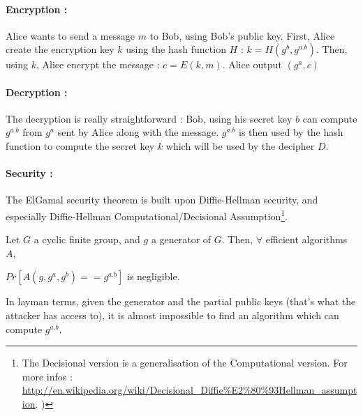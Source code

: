 \paragraph{Encryption :}

Alice wants to send a message $m$ to Bob, using Bob's public key. First, Alice create the encryption key $k$ using the hash function $H$ : $k = H(g^b, g^{a.b}) $. Then, using $k$, Alice encrypt the message : $c = E(k,m)$. Alice output $(g^a, c)$

\paragraph{Decryption :} 
The decryption is really straightforward : Bob, using his secret key $b$ can compute $g^{a.b}$ from $g^a$ sent by Alice along with the message. $g^{a.b}$ is then used by the hash function to compute the secret key $k$ which will be used by the decipher $D$.

\paragraph{Security : \\}

The ElGamal security theorem is built upon Diffie-Hellman security, and especially Diffie-Hellman Computational/Decisional Assumption\footnote{The Decisional version is a generalisation of the Computational version. For more infos : \url{http://en.wikipedia.org/wiki/Decisional_Diffie\%E2\%80\%93Hellman_assumption}. )}.

\begin{mytheorem}
Let $G$ a cyclic finite group, and $g$ a generator of $G$.
Then, $\forall$ efficient algorithms $A$,
\begin{flushright}
	$Pr[ A(g,g^a,g^{b}) == g^{a.b} ]$ is negligible.
\end{flushright} 
\end{mytheorem}
 
 In layman terms, given the generator and the partial public keys (that's what the attacker has access to), it is almost impossible to find an algorithm which can compute $g^{a.b}$.

